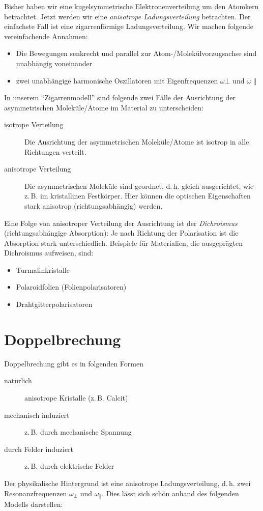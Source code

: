Bisher haben wir eine kugelsymmetrische Elektronenverteilung um den
Atomkern betrachtet. Jetzt werden wir eine \emph{anisotrope
Ladungsverteilung} betrachten. Der einfachste Fall ist eine
zigarrenförmige Ladungsverteilung.
Wir machen folgende vereinfachende Annahmen:
\begin{itemize}
\item Die Bewegungen senkrecht und parallel zur
  Atom-/Molekülvorzugsachse sind unabhängig voneinander 
\item zwei unabhängige harmonische Oszillatoren mit Eigenfrequenzen
$\omega\bot$%
und $\omega\parallel$%
\end{itemize}
In unserem \enquote{Zigarrenmodell} sind folgende zwei Fälle der
Ausrichtung der asymmetrischen Moleküle/Atome im Material zu
unterscheiden:
\begin{description}
\item[isotrope Verteilung] Die Ausrichtung der asymmetrischen
  Moleküle/Atome ist isotrop in alle Richtungen verteilt.
\item[anisotrope Verteilung] Die asymmetrischen Moleküle
  sind geordnet, d.\,h. gleich ausgerichtet, wie z.\,B. im
  kristallinen Festkörper. Hier können die optischen Eigenschaften
  stark anisotrop (richtungsabhängig) werden.
\end{description}
Eine Folge von anisotroper Verteilung der Ausrichtung ist der
\emph{Dichroismus} (richtungsabhängige Absorption):
Je nach Richtung der Polarisation ist die Absorption stark
unterschiedlich.
Beispiele für Materialien, die ausgeprägten Dichroismus aufweisen,
sind:
\begin{itemize}
\item Turmalinkristalle
\item Polaroidfolien (Folienpolarisatoren)
\item Drahtgitterpolarisatoren
\end{itemize}


\section{Doppelbrechung} 
Doppelbrechung gibt es in folgenden Formen
\begin{description}
\item[natürlich] anisotrope Kristalle (z.\,B. Calcit)
\item[mechanisch induziert] z.\,B. durch mechanische Spannung
\item[durch Felder induziert] z.\,B. durch elektrische Felder
\end{description}
Der physikalische Hintergrund ist eine anisotrope Ladungsverteilung,
d.\,h. zwei Resonanzfrequenzen $\omega_\bot$ und $\omega_\parallel$.
Dies lässt sich schön anhand des folgenden Modells darstellen:

